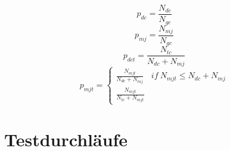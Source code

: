 \begin{equation}
	\label{pdc}
	p_{dc} = \frac{N_{dc}}{N_{gc}}
\end{equation}
\begin{equation}
	\label{pmj}
	p_{mj} = \frac{N_{mj}}{N_{gc}}
\end{equation}
\begin{equation}
	\label{pdct}
	p_{dct} = \frac{N_{tc}}{N_{dc} + N_{mj}}
\end{equation}
\begin{equation}
	\label{pmjt}
	p_{mjt} =
	\begin{cases}
		\frac{N_{mjt}}{N_{dc} + N_{mj}} & if\ N_{mjt} \leq N_{dc} + N_{mj}\\
		\frac{N_{mjt}}{N_{tc} + N_{mjt}}
	\end{cases}
\end{equation}

\section{Testdurchläufe}
